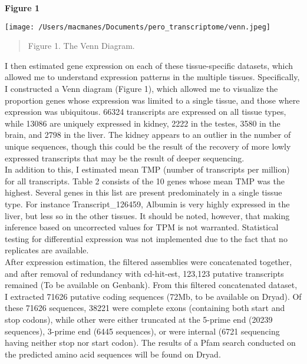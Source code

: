 \documentclass[11pt]{article}
\begin{document}
\textbf{\hypertarget{Figure 1}{Figure 1}} \\
\centerline{\texttt{[image: /Users/macmanes/Documents/pero\_transcriptome/venn.jpeg]}}
\begin{quote}
\small{Figure 1. The Venn Diagram.}
\end{quote}   

I then estimated gene expression on each of these tissue-specific datasets, which allowed me to understand expression patterns in the multiple tissues. Specifically, I constructed a Venn diagram ({\hypertarget{Figure 1}{Figure 1}}), which allowed me to visualize the proportion genes whose expression was limited to a single tissue, and those where expression was ubiquitous. 66324 transcripts are expressed on all tissue types, while 13086 are uniquely expressed in kidney, 2222 in the testes, 3580 in the brain, and 2798 in the liver. The kidney appears to an outlier in the number of unique sequences, though this could be the result of the recovery of more lowly expressed transcripts that may be the result of deeper sequencing.  \\

In addition to this, I estimated mean TMP (number of transcripts per million) for all transcripts. {\hypertarget{Table 2}{Table 2}} consists of the 10 genes whose mean TMP was the highest. Several genes in this list are present predominately in a single tissue type. For instance Transcript\_126459, Albumin is very highly expressed in the liver, but less so in the other tissues. It should be noted, however, that making inference based on uncorrected values for TPM is not warranted. Statistical testing for differential expression was not implemented due to the fact that no replicates are available.  \\  

After expression estimation, the filtered assemblies were concatenated together, and after removal of redundancy with cd-hit-est, 123,123 putative transcripts remained (To be available on Genbank). From this filtered concatenated dataset, I extracted 71626 putative coding sequences (72Mb, to be available on Dryad). Of these 71626 sequences, 38221 were complete exons (containing both start and stop codons), while other were either truncated at the 5-prime end (20239 sequences), 3-prime end (6445 sequences), or were internal (6721 sequencing having neither stop nor start codon). The results of a Pfam search conducted on the predicted amino acid sequences will be found on Dryad. \\
\end{document}
